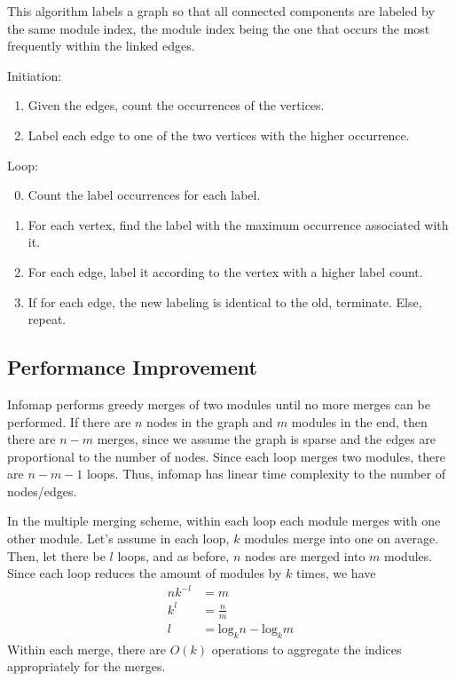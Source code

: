 \documentclass[12pt,a4paper]{article}
\begin{document}
This algorithm labels a graph so that all connected components are labeled by the same module index, the module index being the one that occurs the most frequently within the linked edges.

Initiation:
\begin{enumerate}
    \item Given the edges, count the occurrences of the vertices.
    \item Label each edge to one of the two vertices with the higher occurrence.
\end{enumerate}

Loop:
\begin{enumerate}
    \setcounter{enumi}{-1}
    \item Count the label occurrences for each label.
    \item For each vertex, find the label with the maximum occurrence associated with it.
    \item For each edge, label it according to the vertex with a higher label count.
    \item If for each edge, the new labeling is identical to the old, terminate. Else, repeat.
\end{enumerate}

\subsection{Performance Improvement}

Infomap performs greedy merges of two modules until no more merges can be performed. If there are \(n\) nodes in the graph and \(m\) modules in the end, then there are \(n-m\) merges, since we assume the graph is sparse and the edges are proportional to the number of nodes. Since each loop merges two modules, there are \(n-m-1\) loops. Thus, infomap has linear time complexity to the number of nodes/edges.

In the multiple merging scheme, within each loop each module merges with one other module. Let's assume in each loop, \(k\) modules merge into one on average. Then, let there be \(l\) loops, and as before, \(n\) nodes are merged into \(m\) modules. Since each loop reduces the amount of modules by \(k\) times, we have
\begin{align}
    n k^{-l} &= m \\
    k^l &= \frac{n}{m} \\
    l &= \mathrm{log}_k n -\mathrm{log}_k m
\end{align}
Within each merge, there are \(O(k)\) operations to aggregate the indices appropriately for the merges.
\end{document}
